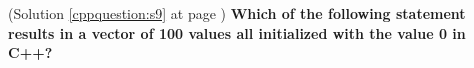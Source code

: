 \begin{cppquestion}
    \label{cppquestion:q9}
    (Solution \ref{cppquestion:s9} at page \pageref{cppquestion:s9})
    \question \textbf{Which of the following statement results in a vector of 100 values all initialized with the value 0 in C++?} 
    \begin{choices}
        \choice {}
        \choice {}
        \choice {}
        \choice {}
        \choice {}
       \end{choices}
\end{cppquestion}


















